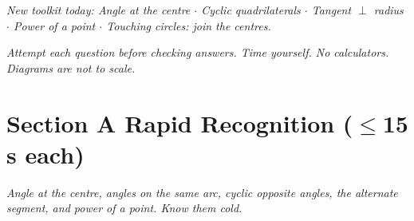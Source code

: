 \documentclass[11pt,a4paper]{article}
\begin{document}
\noindent\textit{New toolkit today: Angle at the centre $\cdot$ Cyclic quadrilaterals $\cdot$ Tangent $\perp$ radius $\cdot$ Power of a point $\cdot$ Touching circles: join the centres.}

\vspace{2pt}
\noindent\textit{Attempt each question before checking answers. Time yourself. No calculators. Diagrams are not to scale.}

\section*{Section A \quad Rapid Recognition \hfill{\normalfont\small($\leq$15 s each)}}

\noindent\textit{Angle at the centre, angles on the same arc, cyclic opposite angles, the alternate segment, and power of a point. Know them cold.}
\end{document}
